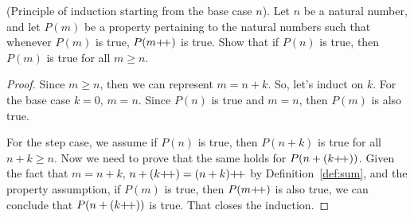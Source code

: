 \begin{proposition}
    \color{red}
    \textup{(Principle of induction starting from the base case $n$)}. Let $n$ be a natural number, and let $P(m)$ be a property pertaining to the natural numbers such that whenever $P(m)$ is true, $P(m\operatorname{\!+\!+})$ is true. Show that if $P(n)$ is true, then $P(m)$ is true for all $m\geq n$.
\end{proposition}

\begin{proof}
    Since $m\geq n$, then we can represent $m=n+k$. So, let's induct on $k$. For the base case $k=0$, $m=n$. Since $P(n)$ is true and $m=n$, then $P(m)$ is also true. 
    
    For the step case, we assume if $P(n)$ is true, then $P(n+k)$ is true for all $n+k\geq n$. Now we need to prove that the same holds for $P(n+(k\operatorname{\!+\!+}))$. Given the fact that $m=n+k$, $n+(k\operatorname{\!+\!+}) = (n+k)\operatorname{\!+\!+}$ by Definition~\ref{def:sum}, and the property assumption, if $P(m)$ is true, then $P(m\operatorname{\!+\!+})$ is also true, we can conclude that $P(n+(k\operatorname{\!+\!+}))$ is true. That closes the induction.
\end{proof}
